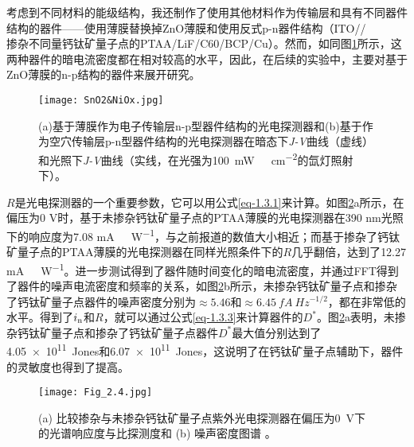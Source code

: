 \documentclass[forlib]{WHUMaster}   %
\begin{document}
{考虑到不同材料的能级结构，我还制作了使用其他材料作为传输层和具有不同器件结构的器件——使用薄膜替换掉ZnO薄膜和使用反式p-n器件结构（ITO//\\掺杂不同量钙钛矿量子点的PTAA/LiF/C60/BCP/Cu）。然而，如同图\ref{fig:2.3.1}所示，这两种器件的暗电流密度都在相对较高的水平，因此，在后续的实验中，主要对基于ZnO薄膜的n-p结构的器件来展开研究。

\begin{figure}[htb]
\centering
  \texttt{[image: SnO2\&NiOx.jpg]}
  \caption{\rm (a)基于薄膜作为电子传输层n-p型器件结构的光电探测器和(b)基于作为空穴传输层p-n型器件结构的光电探测器在暗态下\emph{J-V}曲线（虚线）和光照下\emph{J-V}曲线（实线，在光强为100\ \si{mW \ cm^{-2}}的氙灯照射下）。}
  \label{fig:2.3.1}
\end{figure}

$R$是光电探测器的一个重要参数，它可以用公式\ref{eq-1.3.1}来计算。如图\ref{fig:2.4}a所示，在偏压为0 V时，基于未掺杂钙钛矿量子点的PTAA薄膜的光电探测器在390 nm光照下的响应度为{7.08} \si{mA\ W^{-1}}，与之前报道的数值大小相近\cite{RN25}；而基于掺杂了钙钛矿量子点的PTAA薄膜的光电探测器在同样光照条件下的$R$几乎翻倍，达到了{12.27} \si{mA\ W^{-1}}。进一步测试得到了器件随时间变化的暗电流密度，并通过FFT得到了器件的噪声电流密度和频率的关系，如图\ref{fig:2.4}b所示，未掺杂钙钛矿量子点和掺杂了钙钛矿量子点器件的噪声密度分别为$\approx 5.46$和$\approx 6.45\ \si{fA \ Hz^{-1/2}}$，都在非常低的水平。得到了$i_{\rm{n}}$和$R$，就可以通过公式\ref{eq-1.3.3}来计算器件的$D^*$。图\ref{fig:2.4}a表明，未掺杂钙钛矿量子点和掺杂了钙钛矿量子点器件$D^*$最大值分别达到了\num{4.05e11}\ Jones和\num{6.07e11}\ Jones，这说明了在钙钛矿量子点辅助下，器件的灵敏度也得到了提高。

\begin{figure}[htb]
\centering
  \texttt{[image: Fig\_2.4.jpg]}
  \caption{\rm (a) 比较掺杂与未掺杂钙钛矿量子点紫外光电探测器在偏压为0\ \si{V}下的光谱响应度与比探测度和 (b) 噪声密度图谱 。}
  \label{fig:2.4}
\end{figure}

}
\end{document}

